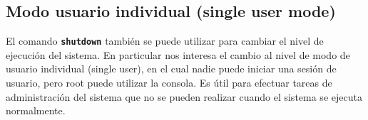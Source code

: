 \documentclass[12pt]{article}
\begin{document}
\subsection{ Modo usuario individual (single user mode)}

 El comando \texttt{\textbf{shutdown}} también se puede utilizar para
cambiar el nivel de ejecución del sistema. En particular nos interesa el 
cambio al nivel de modo de usuario individual
(single user), en el cual nadie puede iniciar una sesión de usuario, pero root
puede utilizar la consola. Es útil para efectuar tareas de administración del
sistema que no se pueden realizar cuando el sistema se ejecuta normalmente.
\end{document}
